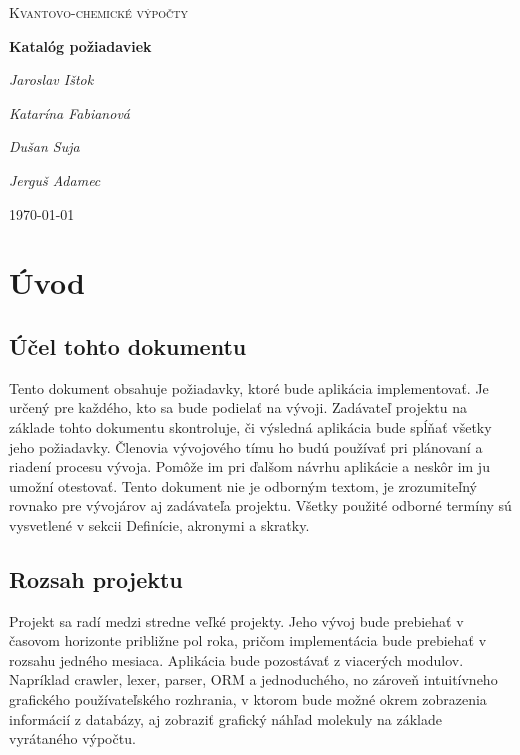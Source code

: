 \documentclass[12pt,a4paper, draft]{article}
\begin{document}
\begin{titlepage}
	\centering
	\par\vspace{1cm}
	{\scshape\LARGE Kvantovo-chemické výpočty \par}
	\vspace{1cm}

	{\huge\bfseries Katalóg požiadaviek  \par}
	\vspace{2cm}
	{\Large\itshape Jaroslav Ištok \par}
	{\Large\itshape Katarína Fabianová \par}
	{\Large\itshape Dušan Suja \par}
	{\Large\itshape Jerguš Adamec \par}
	\vfill
	{\large \today\par}
\end{titlepage}

\pagebreak
\tableofcontents
\pagebreak

\section{Úvod}
\subsection{Účel tohto dokumentu}
Tento dokument obsahuje požiadavky, ktoré bude aplikácia implementovať. Je určený pre každého, kto sa bude podielať na vývoji. Zadávateľ projektu na základe tohto dokumentu skontroluje, či výsledná aplikácia bude spĺňať všetky jeho požiadavky. Členovia vývojového tímu ho budú používať pri plánovaní a riadení procesu vývoja. Pomôže im pri ďalšom návrhu aplikácie a neskôr im ju umožní otestovať. Tento dokument nie je odborným textom, je zrozumiteľný rovnako pre vývojárov aj zadávateľa projektu. Všetky použité odborné termíny sú vysvetlené v sekcii Definície, akronymi a skratky.

\subsection{Rozsah projektu}
Projekt sa radí medzi stredne veľké projekty. Jeho vývoj bude prebiehať v časovom horizonte približne pol roka, pričom implementácia bude prebiehať v rozsahu jedného mesiaca. Aplikácia bude pozostávať z viacerých modulov. Napríklad crawler, lexer, parser, ORM a jednoduchého, no zároveň intuitívneho grafického používateľského rozhrania, v ktorom bude možné okrem zobrazenia informácií z databázy, aj zobraziť grafický náhľad molekuly na základe vyrátaného výpočtu.
\end{document}

